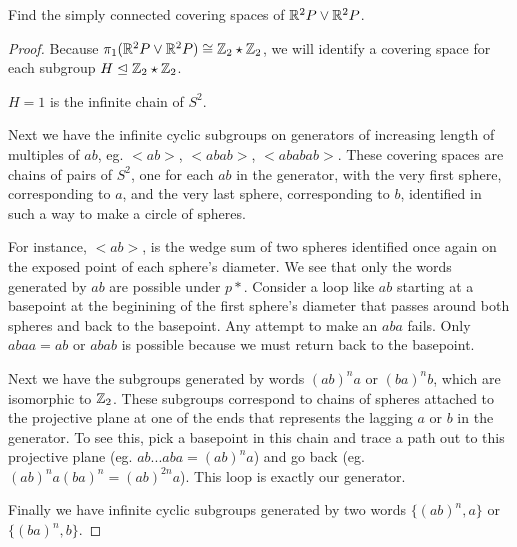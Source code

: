 \documentclass[10pt]{article}
\begin{document}
\begin{exercise}
	Find the simply connected covering spaces of $\mathbb{R}^2P \vee \mathbb{R}^2P$.
\end{exercise}

\begin{proof}
	Because $\pi_1(\mathbb{R}^2P \vee \mathbb{R}^2P) \cong \mathbb{Z}_2 \star \mathbb{Z}_2$, we will identify a
	covering space for each subgroup $H \trianglelefteq \mathbb{Z}_2 \star \mathbb{Z}_2$.

	$H = 1$ is the infinite chain of $S^2$.

	Next we have the infinite cyclic subgroups on generators of increasing length
	of multiples of $ab$, eg. $< ab >$, $< abab >$, $< ababab >$. These covering
	spaces are chains of pairs of $S^2$, one for each $ab$ in the generator, with
	the very first sphere, corresponding to $a$, and the very last sphere,
	corresponding to $b$, identified in such a way to make a circle of spheres.

	For instance, $< ab >$, is the wedge sum of two spheres identified once again
	on the exposed point of each sphere's diameter. We see that only the words
	generated by $ab$ are possible under $p*$. Consider a loop like $ab$ starting
	at a basepoint at the beginining of the first sphere's diameter that passes
	around both spheres and back to the basepoint. Any attempt to make an $aba$
	fails. Only $abaa = ab$ or $abab$ is possible because we must return back to
	the basepoint.

	Next we have the subgroups generated by words $(ab)^n a$ or $(ba)^n b$, which
	are isomorphic to $\mathbb{Z}_2$. These subgroups correspond to chains of spheres
	attached to the projective plane at one of the ends that represents the
	lagging $a$ or $b$ in the generator. To see this, pick a basepoint in this
	chain and trace a path out to this projective plane (eg. $ab...aba = (ab)^n a$) and go
	back (eg. $(ab)^n a (ba)^n = (ab)^{2n}a$). This loop is exactly our
	generator.

	Finally we have infinite cyclic subgroups generated by two words $\{ (ab)^n,
	a \}$ or $\{ (ba)^n, b \}$. 


\end{proof}

\end{document}
